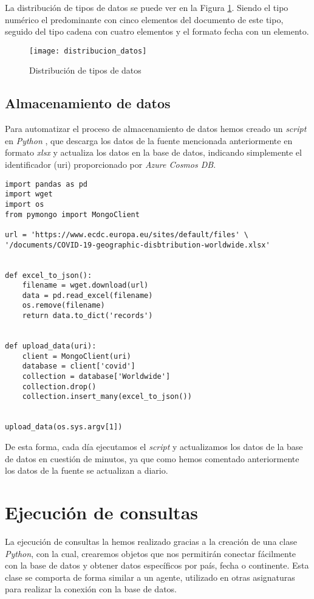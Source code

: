 \documentclass[11pt]{diazessay} %
\begin{document}
La distribución de tipos de datos se puede ver en la Figura \ref{fig:distribucion}. Siendo el tipo numérico el predominante con cinco elementos del documento de este tipo, seguido del tipo cadena con cuatro elementos y el formato fecha con un elemento. 

\begin{figure}[h!]
	\centering
	\texttt{[image: distribucion\_datos]}
	\caption{Distribución de tipos de datos \cite{studio3t}}
	\label{fig:distribucion}
\end{figure}

\subsection*{Almacenamiento de datos}
Para automatizar el proceso de almacenamiento de datos hemos creado un \textit{script} en \textit{Python} \cite{python}, que descarga los datos de la fuente mencionada anteriormente en formato \textit{xlsx} y actualiza los datos en la base de datos, indicando simplemente el identificador (uri) proporcionado por \textit{Azure Cosmos DB}.\\

\lstset{language=Python}
\begin{lstlisting}
import pandas as pd
import wget
import os
from pymongo import MongoClient

url = 'https://www.ecdc.europa.eu/sites/default/files' \
'/documents/COVID-19-geographic-disbtribution-worldwide.xlsx'


def excel_to_json():
	filename = wget.download(url)
	data = pd.read_excel(filename)
	os.remove(filename)
	return data.to_dict('records')


def upload_data(uri):
	client = MongoClient(uri)
	database = client['covid']
	collection = database['Worldwide']
	collection.drop()
	collection.insert_many(excel_to_json())


upload_data(os.sys.argv[1])
\end{lstlisting}

De esta forma, cada día ejecutamos el \textit{script} y actualizamos los datos de la base de datos en cuestión de minutos, ya que como hemos comentado anteriormente los datos de la fuente se actualizan a diario.





\clearpage

\section*{Ejecución de consultas}
La ejecución de consultas la hemos realizado gracias a la creación de una clase \textit{Python}, con la cual, crearemos objetos que nos permitirán conectar fácilmente con la base de datos y obtener datos específicos por país, fecha o continente. Esta clase se comporta de forma similar a un agente, utilizado en otras asignaturas para realizar la conexión con la base de datos.
\end{document}
